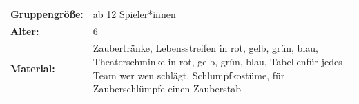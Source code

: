\newpage
\begin{table}[H]
\begin{tabular}{>{\bfseries}lp{8cm}}
   Gruppengröße:   & ab 12 Spieler*innen\\
    Alter: & 6 \\
    Material: & Zaubertränke, Lebensstreifen in rot, gelb, grün, blau, Theaterschminke in rot, gelb, grün, blau, Tabellenfür jedes Team wer wen schlägt, Schlumpfkostüme, für Zauberschlümpfe einen Zauberstab \\ 
\end{tabular}
\end{table} 

